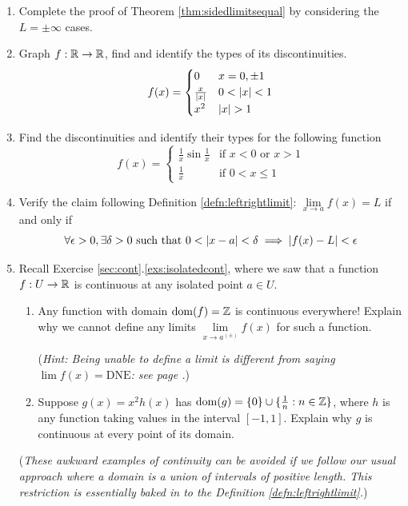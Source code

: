 \begin{exercises}
\begin{enumerate}
	  
	  \item Complete the proof of Theorem \ref{thm:sidedlimitsequal} by considering the $L=\pm\infty$ cases.
	  
	  
	  \item Graph $f:\mathbb{R}\to\mathbb{R}$, find and identify the types of its discontinuities.
	  \[
	  	f(x)=
	  	\begin{cases}
	    	0&x=0,\pm 1\\
	      \frac x{\nm x}&0<\nm x<1\\
	      x^2&\nm x>1
	    \end{cases}
	  \]
	  
	  
	  \item Find the discontinuities and identify their types for the following function
	  \[
	  	f(x)=
	  	\begin{cases}
	  		\frac 1x\sin\frac 1x&\text{if $x<0$ or $x>1$}\\
	  		\frac 1x&\text{if }0<x\le 1
	  	\end{cases}
	  \]
	  
	  
	  \item Verify the claim following Definition \ref{defn:leftrightlimit}: $\lim\limits_{x\to a}f(x)=L$ if and only if
	  \[
	  	\forall\epsilon>0,\exists\delta>0\text{ such that }0<\left| x-a\right|<\delta\implies \left| f(x)-L\right|<\epsilon
	  \]
	  
	  
	  \item Recall Exercise \ref*{sec:cont}.\ref{exs:isolatedcont}, where we saw that a function $f:U\to\mathbb{R}$ is continuous at any isolated point $a\in U$.
	  \begin{enumerate}
	    \item Any function with domain $\operatorname{dom}(f)=\mathbb{Z}$ is continuous everywhere! Explain why we cannot define any limits $\lim\limits_{x\to a^{(\pm)}}f(x)$ for such a function.\par
	    (\emph{Hint: Being unable to define a limit is different from saying $\lim f(x)=\text{DNE}$: see page \pageref{it:contlimit}.})
	    \item Suppose $g(x)=x^2h(x)$ has $\operatorname{dom}(g)=\{0\}\cup\{\tfrac 1n:n\in\mathbb{Z}\}$, where $h$ is any function taking values in the interval $[-1,1]$. Explain why $g$ is continuous at every point of its domain.
		\end{enumerate}
		(\emph{These awkward examples of continuity can be avoided if we follow our usual approach where a domain is a union of intervals of positive length. This restriction is essentially baked in to the Definition \ref{defn:leftrightlimit}.})
	  
	\end{enumerate}
\end{exercises}